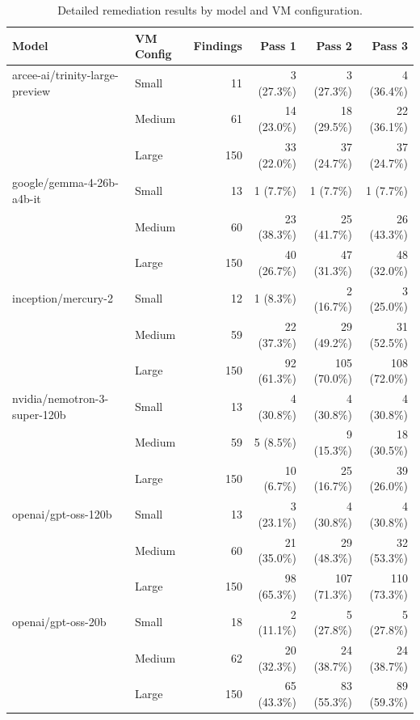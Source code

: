 \begin{table}
\centering
\small
\setlength{\tabcolsep}{6pt}
\renewcommand{\arraystretch}{1.15}
\caption{Detailed remediation results by model and VM configuration.}
\label{tab:results}
\begin{tabular}{llrrrr}
\toprule
Model & VM Config & Findings & Pass 1 & Pass 2 & Pass 3 \\
\midrule
arcee-ai/trinity-large-preview & Small & 11 & 3 (27.3\%) & 3 (27.3\%) & 4 (36.4\%) \\
 & Medium & 61 & 14 (23.0\%) & 18 (29.5\%) & 22 (36.1\%) \\
 & Large & 150 & 33 (22.0\%) & 37 (24.7\%) & 37 (24.7\%) \\
\midrule
google/gemma-4-26b-a4b-it & Small & 13 & 1 (7.7\%) & 1 (7.7\%) & 1 (7.7\%) \\
 & Medium & 60 & 23 (38.3\%) & 25 (41.7\%) & 26 (43.3\%) \\
 & Large & 150 & 40 (26.7\%) & 47 (31.3\%) & 48 (32.0\%) \\
\midrule
inception/mercury-2 & Small & 12 & 1 (8.3\%) & 2 (16.7\%) & 3 (25.0\%) \\
 & Medium & 59 & 22 (37.3\%) & 29 (49.2\%) & 31 (52.5\%) \\
 & Large & 150 & 92 (61.3\%) & 105 (70.0\%) & 108 (72.0\%) \\
\midrule
nvidia/nemotron-3-super-120b & Small & 13 & 4 (30.8\%) & 4 (30.8\%) & 4 (30.8\%) \\
 & Medium & 59 & 5 (8.5\%) & 9 (15.3\%) & 18 (30.5\%) \\
 & Large & 150 & 10 (6.7\%) & 25 (16.7\%) & 39 (26.0\%) \\
\midrule
openai/gpt-oss-120b & Small & 13 & 3 (23.1\%) & 4 (30.8\%) & 4 (30.8\%) \\
 & Medium & 60 & 21 (35.0\%) & 29 (48.3\%) & 32 (53.3\%) \\
 & Large & 150 & 98 (65.3\%) & 107 (71.3\%) & 110 (73.3\%) \\
\midrule
openai/gpt-oss-20b & Small & 18 & 2 (11.1\%) & 5 (27.8\%) & 5 (27.8\%) \\
 & Medium & 62 & 20 (32.3\%) & 24 (38.7\%) & 24 (38.7\%) \\
 & Large & 150 & 65 (43.3\%) & 83 (55.3\%) & 89 (59.3\%) \\
\bottomrule
\end{tabular}
\end{table}